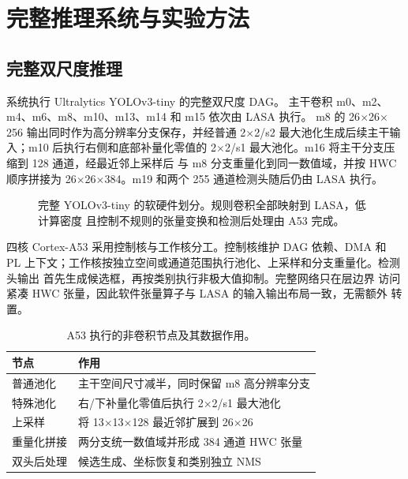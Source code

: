 \section{完整推理系统与实验方法}
\label{sec:system-method}

\subsection{完整双尺度推理}

系统执行 Ultralytics YOLOv3-tiny 的完整双尺度 DAG\cite{ultralyticsv95}。
主干卷积 m0、m2、m4、m6、m8、m10、m13、m14 和 m15 依次由 LASA 执行。
m8 的 26$\times$26$\times$256 输出同时作为高分辨率分支保存，并经普通
2$\times$2/s2 最大池化生成后续主干输入；m10 后执行右侧和底部补量化零值的
2$\times$2/s1 最大池化。m16 将主干分支压缩到 128 通道，经最近邻上采样后
与 m8 分支重量化到同一数值域，并按 HWC 顺序拼接为
26$\times$26$\times$384。m19 和两个 255 通道检测头随后仍由 LASA 执行。

\begin{figure}[t]
\centering
{}
\caption{完整 YOLOv3-tiny 的软硬件划分。规则卷积全部映射到 LASA，低计算密度
且控制不规则的张量变换和检测后处理由 A53 完成。}
\label{fig:dag-placeholder}
\end{figure}

四核 Cortex-A53 采用控制核与工作核分工。控制核维护 DAG 依赖、DMA 和 PL
上下文；工作核按独立空间或通道范围执行池化、上采样和分支重量化。检测头输出
首先生成候选框，再按类别执行非极大值抑制\cite{nms2017}。完整网络只在层边界
访问紧凑 HWC 张量，因此软件张量算子与 LASA 的输入输出布局一致，无需额外
转置。

\begin{table}[t]
\centering
\caption{A53 执行的非卷积节点及其数据作用。}
\label{tab:a53-ops}
\small
\begin{tabular}{lp{47mm}}
\toprule
节点 & 作用 \\
\midrule
普通池化 & 主干空间尺寸减半，同时保留 m8 高分辨率分支 \\
特殊池化 & 右/下补量化零值后执行 2$\times$2/s1 最大池化 \\
上采样 & 将 13$\times$13$\times$128 最近邻扩展到 26$\times$26 \\
重量化拼接 & 两分支统一数值域并形成 384 通道 HWC 张量 \\
双头后处理 & 候选生成、坐标恢复和类别独立 NMS \\
\bottomrule
\end{tabular}
\end{table}

